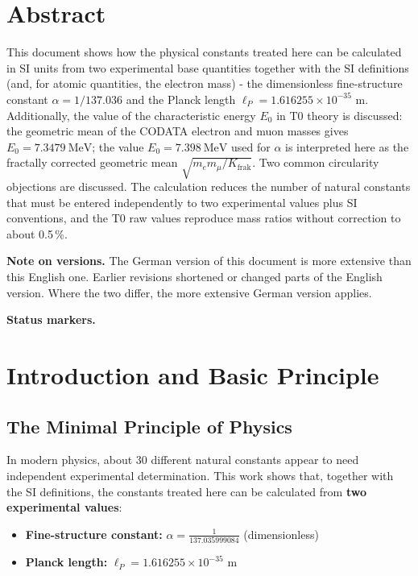 \section*{Abstract}
		This document shows how the physical constants treated here can be calculated in SI units from two experimental base quantities together with the SI definitions (and, for atomic quantities, the electron mass) - the dimensionless fine-structure constant $\alpha = 1/137.036$ and the Planck length $\ell_P = 1.616255 \times 10^{-35}$ m. Additionally, the value of the characteristic energy $E_0$ in T0 theory is discussed: the geometric mean of the CODATA electron and muon masses gives $E_0 = \SI{7.3479}{\MeV}$; the value $E_0 = \SI{7.398}{\MeV}$ used for $\alpha$ is interpreted here as the fractally corrected geometric mean $\sqrt{m_e m_\mu/K_{\text{frak}}}$. Two common circularity objections are discussed. The calculation reduces the number of natural constants that must be entered independently to two experimental values plus SI conventions, and the T0 raw values reproduce mass ratios without correction to about 0.5\,\%.

	\medskip\noindent\textbf{Note on versions.} The German version of this document is more extensive than this English one. Earlier revisions shortened or changed parts of the English version. Where the two differ, the more extensive German version applies.


	\medskip\noindent\textbf{Status markers.}
	

	

	\section{Introduction and Basic Principle}
	
	\subsection{The Minimal Principle of Physics}
	
	In modern physics, about 30 different natural constants appear to need independent experimental determination. This work shows that, together with the SI definitions, the constants treated here can be calculated from \textbf{two experimental values}:
	
	\begin{tcolorbox}[colback=blue!5!white,colframe=blue!75!black,title=Fundamental Input Data]
		\begin{itemize}
			\item \textbf{Fine-structure constant:} $\alpha = \frac{1}{137.035999084}$ (dimensionless)
			\item \textbf{Planck length:} $\ell_P = 1.616255 \times 10^{-35}$ \si{\meter}
		\end{itemize}
	\end{tcolorbox}
	
